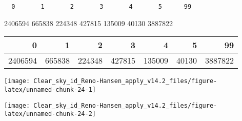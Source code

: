 \documentclass[
  10pt,
  a4paper,oneside]{article}
\newenvironment{Shaded}{\begin{snugshade}}{\end{snugshade}}
\newcommand{\CommentTok}[1]{\textcolor[rgb]{0.56,0.35,0.01}{\textit{#1}}}
\newcommand{\DataTypeTok}[1]{\textcolor[rgb]{0.13,0.29,0.53}{#1}}
\newcommand{\DecValTok}[1]{\textcolor[rgb]{0.00,0.00,0.81}{#1}}
\newcommand{\KeywordTok}[1]{\textcolor[rgb]{0.13,0.29,0.53}{\textbf{#1}}}
\newcommand{\NormalTok}[1]{#1}
\newcommand{\OperatorTok}[1]{\textcolor[rgb]{0.81,0.36,0.00}{\textbf{#1}}}
\newcommand{\StringTok}[1]{\textcolor[rgb]{0.31,0.60,0.02}{#1}}
\begin{document}
\begin{verbatim}
  0       1       2       3       4       5      99 
\end{verbatim}

2406594 665838 224348 427815 135009 40130 3887822

\begin{longtable}[]{@{}rrrrrrr@{}}
\toprule
0 & 1 & 2 & 3 & 4 & 5 & 99\tabularnewline
\midrule
\endhead
2406594 & 665838 & 224348 & 427815 & 135009 & 40130 & 3887822\tabularnewline
\bottomrule
\end{longtable}

\begin{center}\texttt{[image: Clear\_sky\_id\_Reno-Hansen\_apply\_v14.2\_files/figure-latex/unnamed-chunk-24-1]} \end{center}

\begin{center}\texttt{[image: Clear\_sky\_id\_Reno-Hansen\_apply\_v14.2\_files/figure-latex/unnamed-chunk-24-2]} \end{center}

\begin{Shaded}
\end{Shaded}
\end{document}

